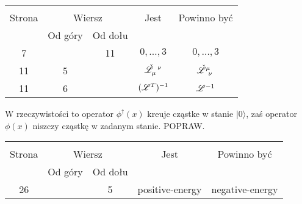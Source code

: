 \documentclass[a4paper,11pt]{article}
\begin{document}
\begin{center}

  \begin{tabular}{|c|c|c|c|c|}
    \hline
    & \multicolumn{2}{c|}{} & & \\
    Strona & \multicolumn{2}{c|}{Wiersz} & Jest
                              & Powinno być \\ \cline{2-3}
    & Od góry & Od dołu & & \\
    \hline
    7   & & 11 & $0, \ldots,\!3$ & $0, \ldots, 3$ \\
    11  &  5 & & $\tensor[]{ \check{ \Lcal } }{ _{ \mu }^{ \nu } }$
           & $\tensor[]{ \check{ \Lcal } }{ ^{ \mu }_{ \nu } }$ \\
    11  &  6 & & $( \mathcal{L}^{ T } )^{ -1 }$ & $\mathcal{L}^{ -1 }$ \\
    \hline
  \end{tabular}

\end{center}


\vspace{\spaceTwo}














 W rzeczywistości to operator $\phi^{ \dagger }( x )$
kreuje cząstke w stanie $| 0 \rangle$, zaś operator $\phi( x )$
niszczy cząstkę w zadanym stanie. POPRAW.





\begin{center}

  \begin{tabular}{|c|c|c|c|c|}
    \hline
    & \multicolumn{2}{c|}{} & & \\
    Strona & \multicolumn{2}{c|}{Wiersz} & Jest
                              & Powinno być \\ \cline{2-3}
    & Od góry & Od dołu & & \\
    \hline
    26  & &  5 & positive-energy & negative-energy \\
    \hline
  \end{tabular}

\end{center}
\end{document}
